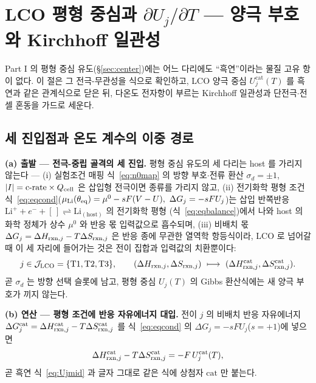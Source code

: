 \section{LCO 평형 중심과 $\partial U_j/\partial T$ --- 양극 부호와 Kirchhoff 일관성}\label{sec:lco-center}
Part I 의 평형 중심 유도(\S\ref{sec:center})에는 어느 다리에도 ``흑연''이라는 물질 고유 항이 없다. 이 절은 그
전극-무관성을 식으로 확인하고, LCO 양극 중심 $U_j^\mathrm{cat}(T)$ 를 흑연과 같은 관계식으로 닫은 뒤, 다온도
전자항이 부르는 Kirchhoff 일관성과 단전극$\cdot$전셀 혼동을 가드로 세운다.

\subsection{세 진입점과 온도 계수의 이중 경로}\label{sec:lco-center-deriv}
\textbf{(a) 출발 --- 전극-중립 골격의 세 진입.} 평형 중심 유도의 세 다리는 host 를 가리지 않는다 ---
(i) 실험조건 매핑 식~\eqref{eq:n0map} 의 방향 부호$\cdot$전류 환산
$\sigma_d=\pm1$, $|I|=\text{c-rate}\times Q_{\mathrm{cell}}$ 은 삽입형 전극이면 종류를 가리지 않고, (ii) 전기화학 평형
조건 식~\eqref{eq:eqcond}($\mu_\mathrm{Li}(\theta_{\mathrm{eq}})=\mu^0-sF(V-U),\ \Delta G_j=-sFU_j$)는 삽입
반쪽반응 $\mathrm{Li}^++e^-+[\,]\rightleftharpoons\mathrm{Li}_{(\text{host})}$ 의 전기화학 평형
(식~\eqref{eq:eqbalance})에서 나와 host 의 화학 정체가 상수 $\mu^0$ 와 반응 몫 입력값으로 흡수되며,
(iii) 비배치 몫 $\Delta G_j=\Delta H_{\mathrm{rxn},j}-T\Delta S_{\mathrm{rxn},j}$ 은 반응 종에 무관한 열역학 항등식이라,
LCO 로 넘어갈 때 이 세 자리에 들어가는 것은 전이 집합과 입력값의 치환뿐이다:
\begin{equation}
j\in\mathcal J_\mathrm{LCO}=\{\mathrm{T1},\mathrm{T2},\mathrm{T3}\},\qquad
(\Delta H_{\mathrm{rxn},j},\Delta S_{\mathrm{rxn},j})\ \longmapsto\
(\Delta H_{\mathrm{rxn},j}^\mathrm{cat},\Delta S_{\mathrm{rxn},j}^\mathrm{cat}).
\label{eq:lco-n0sub}
\end{equation}
곧 $\sigma_d$ 는 방향 선택 슬롯에 남고, 평형 중심 $U_j(T)$ 의 Gibbs 환산식에는 새 양극 부호가 끼지 않는다.

\textbf{(b) 연산 --- 평형 조건에 반응 자유에너지 대입.}
전이 $j$ 의 비배치 반응 자유에너지 $\Delta G_j^\mathrm{cat}=\Delta H_{\mathrm{rxn},j}^\mathrm{cat}
-T\Delta S_{\mathrm{rxn},j}^\mathrm{cat}$ 를 식~\eqref{eq:eqcond} 의 $\Delta G_j=-sFU_j$($s=+1$)에 넣으면
\[
\Delta H_{\mathrm{rxn},j}^\mathrm{cat}-T\Delta S_{\mathrm{rxn},j}^\mathrm{cat}=-F\,U_j^\mathrm{cat}(T),
\]
곧 흑연 식~\eqref{eq:Ujmid} 과 글자 그대로 같은 식에 상첨자 $\mathrm{cat}$ 만 붙는다.

